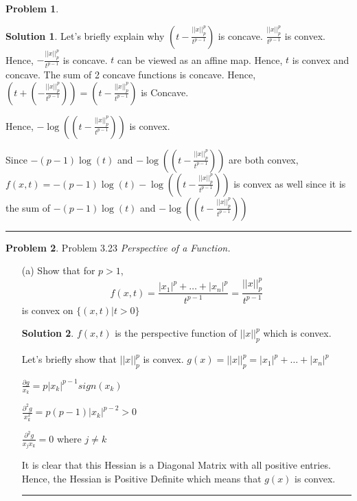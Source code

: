 \documentclass{article}
\theoremstyle{definition}
\newtheorem{problem}{Problem}
\def\fline{\rule{0.75\linewidth}{0.5pt}}
\newcommand{\finishline}{\begin{center}\fline\end{center}}
\newtheorem*{solution*}{Solution}
\newenvironment{solution}{\begin{solution*}}{{\finishline} \end{solution*}}
\begin{document}
\begin{problem}
\begin{itemize}
\begin{solution}
        Let's briefly explain why $(t - \frac{||x||^p_p}{t^{p - 1}})$ is concave. $\frac{||x||^p_p}{t^{p - 1}}$ is convex. Hence, $-\frac{||x||^p_p}{t^{p - 1}}$ is concave. $t$ can be viewed as an affine map. Hence, $t$ is convex and concave. The sum of 2 concave functions is concave. Hence, $(t + (- \frac{||x||^p_p}{t^{p - 1}})) = (t - \frac{||x||^p_p}{t^{p - 1}})$ is Concave. 

        Hence, $- \log((t - \frac{||x||^p_p}{t^{p - 1}}))$ is convex. 

        Since $-(p - 1)\log(t)$ and $- \log((t - \frac{||x||^p_p}{t^{p - 1}}))$ are both convex, $f(x, t) = -(p - 1)\log(t) - \log((t - \frac{||x||^p_p}{t^{p - 1}}))$ is convex as well since it is the sum of $-(p - 1)\log(t)$ and $- \log((t - \frac{||x||^p_p}{t^{p - 1}}))$
    \end{solution}
\end{itemize}
    
\end{problem}

\begin{problem} Problem 3.23
    \textit{Perspective of a Function.}

    \begin{itemize}
        \item[(a)] Show that for $p > 1$, 
        \begin{equation}
            f(x, t) = \frac{|x_1|^p + \dots + |x_n|^p}{t^{p - 1}} = \frac{||x||_p^p}{t^{p - 1}}
        \end{equation}
        is convex on $\{ (x, t) | t > 0\}$

        \begin{solution}
            $f(x, t)$ is the perspective function of $||x||_p^p$ which is convex. 

            Let's briefly show that $||x||_p^p$ is convex. \newline 
            $g(x) = ||x||_p^p = |x_1|^p + \dots + |x_n|^p$ \newline 

            $\frac{\partial g}{x_k} = p |x_k|^{p - 1} sign(x_k)$

            $\frac{\partial^2 g}{x_k^2} = p(p - 1) |x_k|^{p - 2} > 0$

            $\frac{\partial^2 g}{x_j x_k} =0$ where $j \neq k$

            It is clear that this Hessian is a Diagonal Matrix with all positive entries. Hence, the Hessian is Positive Definite which means that $g(x)$ is convex. 
        \end{solution}
    \end{itemize}
\end{problem}
\end{document}
